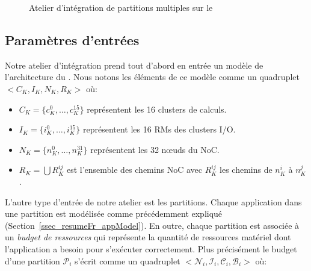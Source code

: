 \documentclass[main.tex]{subfiles}
\begin{document}
\begin{figure}
    \centering
    \scalebox{0.9}{}
    \caption{Atelier d'intégration de partitions multiples sur le \mppalong}
    \label{fig_resumeFr_workFlow}
\end{figure}



\subsection{Paramètres d'entrées}
\label{ssec_resumeFr_paramEntreeWorkflow}
Notre atelier d'intégration prend tout d'abord en entrée un modèle de l'architecture du \mppalong. Nous notons les éléments de ce modèle comme un quadruplet $< C_K , I_K , N_K, R_K >$ où:
\begin{itemize}
    \item $C_K = \{ c_K^0 , \ldots , c_K^{15} \}$ représentent les 16 clusters de calculs.
    \item $I_K = \{ i_K^0 , \ldots , i_K^{15} \}$ représentent les 16 RMs des clusters I/O.
    \item $N_K = \{ n_K^0 , \ldots , n_K^{31} \}$ représentent les 32 n\oe{}uds du NoC.
    \item $R_K = \bigcup R_K^{ij}$ est l'ensemble des chemins NoC avec $R_K^{ij}$ les chemins de $n_K^i$ à $n_K^j$.
\end{itemize}

L'autre type d'entrée de notre atelier est les partitions. Chaque application dans une partition est modélisée comme précédemment expliqué (Section~\ref{ssec_resumeFr_appModel}). En outre, chaque partition est associée à un \emph{budget de ressources} qui représente la quantité de ressources matériel dont l'application a besoin pour s'exécuter correctement. Plus précisément le budget d'une partition $\mathcal{P}_i$ s'écrit comme un quadruplet $<\mathcal{N}_i , \mathcal{I}_i , \mathcal{C}_i , \mathcal{B}_i>$ où:
\end{document}
